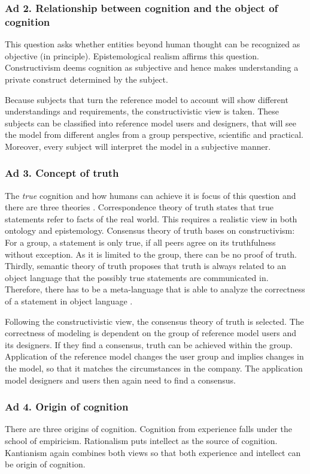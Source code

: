 \subsubsection{Ad 2. Relationship between cognition and the object of cognition}
This question asks whether entities beyond human thought can be recognized as objective (in principle). Epistemological realism affirms this question. Constructivism deems cognition as subjective and hence makes understanding a private construct determined by the subject. 

Because subjects that turn the reference model to account will show different understandings and requirements, the constructivistic view is taken. These subjects can be classified into reference model users and designers, that will see the model from different angles from a group perspective, \eg scientific and practical. Moreover, every subject will interpret the model in a subjective manner.

\subsubsection{Ad 3. Concept of truth}
The \textit{true} cognition and how humans can achieve it is focus of this question and there are three theories \citep{habermas1973}. Correspondence theory of truth states that true statements refer to facts of the real world. This requires a realistic view in both ontology and epistemology. Consensus theory of truth bases on constructivism: For a group, a statement is only true, if all peers agree on its truthfulness without exception. As it is limited to the group, there can be no proof of truth. Thirdly, semantic theory of truth proposes that truth is always related to an object language that the possibly true statements are communicated in. Therefore, there has to be a meta-language that is able to analyze the correctness of a statement in object language \citep{tarski1944}. 

Following the constructivistic view, the consensus theory of truth is selected. The correctness of modeling is dependent on the group of reference model users and its designers. If they find a consensus, truth can be achieved within the group. Application of the reference model changes the user group and implies changes in the model, so that it matches the circumstances in the company. The application model designers and users then again need to find a consensus.

\subsubsection{Ad 4. Origin of cognition}
There are three origins of cognition. Cognition from experience falls under the school of empiricism. Rationalism puts intellect as the source of cognition. Kantianism again combines both views so that both experience and intellect can be origin of cognition. 

